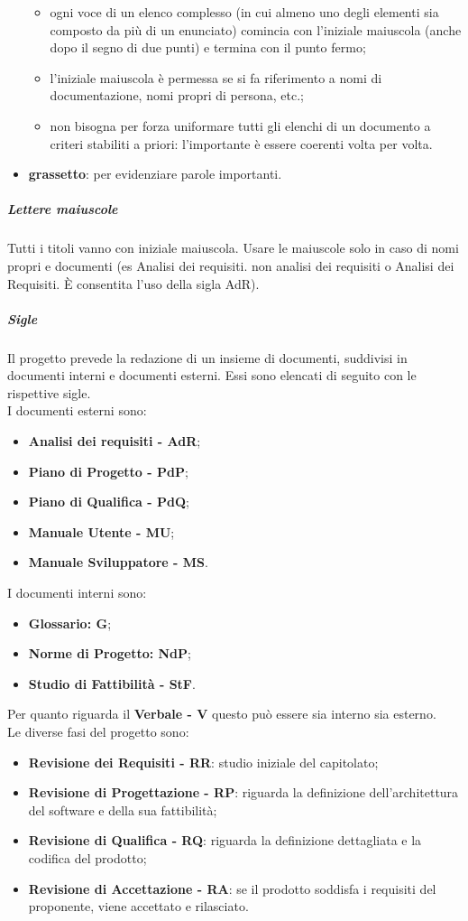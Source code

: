 \begin{itemize}
\begin{itemize}
								\item ogni voce di un elenco complesso (in cui almeno uno degli elementi sia composto da più di un enunciato) comincia con l’iniziale maiuscola (anche dopo il segno di due punti) e termina con il punto 										fermo;
								\item l’iniziale maiuscola è permessa se si fa riferimento a nomi di documentazione, nomi propri di persona, etc.;
								\item non bisogna per forza uniformare tutti gli elenchi di un documento a criteri stabiliti a priori: l’importante è essere coerenti volta per volta.
							\end{itemize}
						\item \textbf{grassetto}: per evidenziare parole importanti.
					\end{itemize}
				\subparagraph{Lettere maiuscole}
				Tutti i titoli vanno con iniziale maiuscola. Usare le maiuscole solo in caso di nomi propri e documenti (es Analisi dei requisiti. non analisi dei requisiti o Analisi dei Requisiti. È consentita l'uso della sigla AdR).
				\subparagraph{Sigle}
				Il progetto prevede la redazione di un insieme di documenti, suddivisi in documenti interni e documenti esterni. Essi sono elencati di seguito con le rispettive sigle.\\
				I documenti esterni sono:
				\begin{itemize}
				\item \textbf{Analisi dei requisiti - AdR};
				\item \textbf{Piano di Progetto - PdP};
				\item \textbf{Piano di Qualifica - PdQ};
				\item \textbf{Manuale Utente - MU};
				\item \textbf{Manuale Sviluppatore - MS}.
				\end{itemize}
				I documenti interni sono:
				\begin{itemize}
				\item \textbf{Glossario: G};
				\item \textbf{Norme di Progetto: NdP};
				\item \textbf{Studio di Fattibilità - StF}.
				\end{itemize}
				Per quanto riguarda il \textbf{Verbale - V} questo può essere sia interno sia esterno.
\\
				Le diverse fasi del progetto sono: 
				\begin{itemize}
				\item \textbf{Revisione dei Requisiti - RR}: studio iniziale del capitolato;
				\item \textbf{Revisione di Progettazione - RP}: riguarda la definizione dell'architettura del software e della sua fattibilità;
				\item \textbf{Revisione di Qualifica - RQ}: riguarda la definizione dettagliata e la codifica del prodotto;
				\item \textbf{Revisione di Accettazione - RA}: se il prodotto soddisfa i requisiti del proponente, viene accettato e rilasciato.
				\end{itemize}
